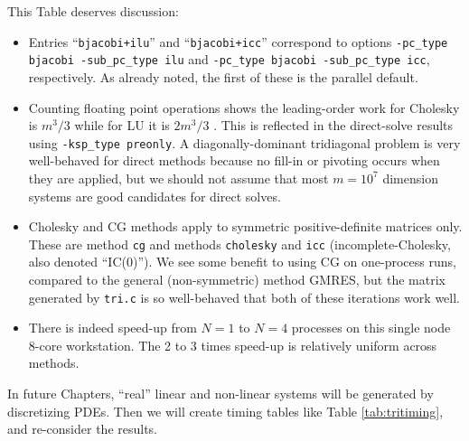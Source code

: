 This Table deserves discussion:
\begin{itemize}
\item Entries ``\texttt{bjacobi+ilu}'' and ``\texttt{bjacobi+icc}'' correspond to options \texttt{-pc\_type bjacobi -sub\_pc\_type ilu} and \texttt{-pc\_type bjacobi -sub\_pc\_type icc}, respectively.  As already noted, the first of these is the parallel default.
\item Counting floating point operations shows the leading-order work for Cholesky is $m^3/3$ while for LU it is $2 m^3/3$ \citep{TrefethenBau}.  This is reflected in the direct-solve results using \texttt{-ksp\_type preonly}.  A diagonally-dominant tridiagonal problem is very well-behaved for direct methods because no fill-in or pivoting occurs when they are applied, but we should not assume that most $m=10^7$ dimension systems are good candidates for direct solves.
\item Cholesky and CG methods apply to symmetric positive-definite matrices only.  These are \pKSP method \texttt{cg} and \pPC methods \texttt{cholesky} and \texttt{icc} (incomplete-Cholesky, also denoted ``IC($0$)'').  We see some benefit to using CG on one-process runs, compared to the general (non-symmetric) method GMRES, but the matrix generated by \texttt{tri.c} is so well-behaved that both of these iterations work well.
\item There is indeed speed-up from $N=1$ to $N=4$ processes on this single node 8-core workstation.  The 2 to 3 times speed-up is relatively uniform across methods.
\end{itemize}

In future Chapters, ``real'' linear and non-linear systems will be generated by discretizing PDEs.  Then we will create timing tables like Table \ref{tab:tritiming}, and re-consider the results.

